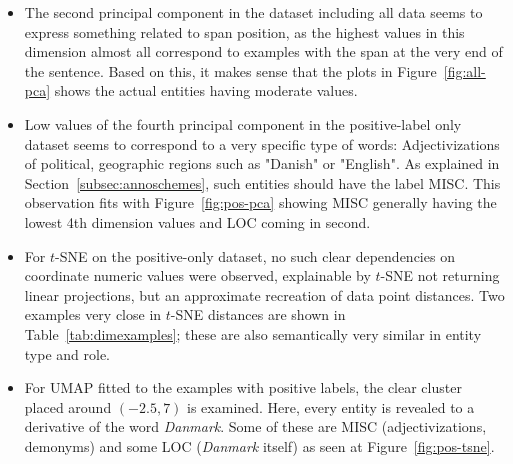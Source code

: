 \documentclass[main.tex]{subfiles}
\begin{document}
\begin{itemize}
    \item
        The second principal component in the dataset including all data seems to express something related to span position, as the highest values in this dimension almost all correspond to examples with the span at the very end of the sentence.
        Based on this, it makes sense that the plots in Figure~\ref{fig:all-pca} shows the actual entities having moderate values.
    \item
        Low values of the fourth principal component in the positive-label only dataset seems to correspond to a very specific type of words:
        Adjectivizations of political, geographic regions such as "Danish" or "English".
        As explained in Section~\ref{subsec:annoschemes}, such entities should have the label MISC.
        This observation fits with Figure~\ref{fig:pos-pca} showing MISC generally having the lowest 4th dimension values and LOC coming in second.
    \item
        For $t$-SNE on the positive-only dataset, no such clear dependencies on coordinate numeric values were observed, explainable by $t$-SNE not returning linear projections, but an approximate recreation of data point distances.
        Two examples very close in $t$-SNE distances are shown in Table~\ref{tab:dimexamples}; these are also semantically very similar in entity type and role.
    \item
        For UMAP fitted to the examples with positive labels, the clear cluster placed around $\left( -2.5, 7\right)$ is examined.
        Here, every entity is revealed to a derivative of the word \emph{Danmark}.
        Some of these are MISC (adjectivizations, demonyms) and some LOC (\emph{Danmark} itself) as seen at Figure~\ref{fig:pos-tsne}.
\end{itemize}
\end{document}
